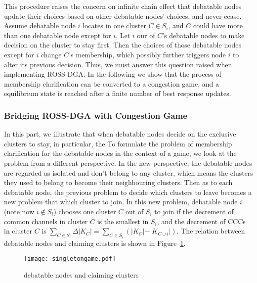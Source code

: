 This procedure raises the concern on infinite chain effect that debatable nodes update their choices based on other debatable nodes' choices, and never cease.
Assume debatable node $i$ locates in one cluster $C\in S_i$, and $C$ could have more than one debatable node except for $i$.
Let $i$ our of $C$'s debatable nodes to make decision on the cluster to stay first.
Then the choices of those debatable nodes except for $i$ change $C$'s membership, which possibly further triggers node $i$ to alter its previous decision.
Thus, we must answer this question raised when implementing ROSS-DGA.
In the following we show that the process of membership clarification can be converted to a congestion game, and a equilibrium state is reached after a finite number of best response updates.

\subsubsection*{Bridging ROSS-DGA with Congestion Game}
In this part, we illustrate that when debatable nodes decide on the exclusive clusters to stay, in particular, the 
To formulate the problem of membership clarification for the debatable nodes in the context of a game, we look at the problem from a different perspective. 
In the new perspective, the debatable nodes are regarded as isolated and don't belong to any cluster, which means the clusters they used to belong to become their neighbouring clusters. 
Then as to each debatable node, the previous problem to decide which clusters to leave becomes a new problem that which cluster to join.
In this new problem, debatable node $i$ (note now $i\notin S_i$) chooses one cluster $C$ out of $S_i$ to join if the decrement of common channels in cluster $C$ is the  %
smallest in $S_i$, and the decrement of CCCs in cluster $C$ is $\sum_{C\in S_i}\Delta\vert K_C \vert=\sum_{C\in S_i}({\vert K_{C} \vert-\vert K_{C\cup i} \vert})$. %
The relation between debatable nodes and claiming clusters is shown in Figure~\ref{debatable_nodes_claiming_cluster}.
\begin{figure}[ht!]
  \centering
  \texttt{[image: singletongame.pdf]}
  \caption{debatable nodes and claiming clusters}
  \label{debatable_nodes_claiming_cluster}
\end{figure}

